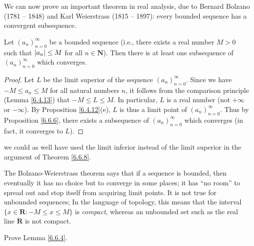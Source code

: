 \begin{note}
    We can now prove an important theorem in real analysis, due to Bernard Bolzano (1781 -- 1848) and Karl Weierstrass (1815 -- 1897):
    every bounded sequence has a convergent subsequence.
\end{note}

\begin{theorem}\label{6.6.8}
    Let \((a_n)_{n = 0}^\infty\) be a bounded sequence
    (i.e., there exists a real number \(M > 0\) such that \(\abs*{a_n} \leq M\) for all \(n \in \mathbf{N}\)).
    Then there is at least one subsequence of \((a_n)_{n = 0}^\infty\) which converges.
\end{theorem}

\begin{proof}
    Let \(L\) be the limit superior of the sequence \((a_n)_{n = 0}^\infty\).
    Since we have \(-M \leq a_n \leq M\) for all natural numbers \(n\), it follows from the comparison principle (Lemma \ref{6.4.13}) that \(-M \leq L \leq M\).
    In particular, \(L\) is a real number (not \(+\infty\) or \(-\infty\)).
    By Proposition \ref{6.4.12}(e), \(L\) is thus a limit point of \((a_n)_{n = 0}^\infty\).
    Thus by Proposition \ref{6.6.6}, there exists a subsequence of \((a_n)_{n = 0}^\infty\) which converges
    (in fact, it converges to \(L\)).
\end{proof}

\begin{note}
    we could as well have used the limit inferior instead of the limit superior in the argument of Theorem \ref{6.6.8}.
\end{note}

\begin{remark}\label{6.6.9}
    The Bolzano-Weierstrass theorem says that if a sequence is bounded, then eventually it has no choice but to converge in some places;
    it has ``no room'' to spread out and stop itself from acquiring limit points.
    It is not true for unbounded sequences;
    In the language of topology, this means that the interval \(\{x \in \mathbf{R} : -M \leq x \leq M\}\) is \emph{compact}, whereas an unbounded set such as the real line \(\mathbf{R}\) is not compact.
\end{remark}

\exercisesection

\begin{exercise}\label{ex 6.6.1}
    Prove Lemma \ref{6.6.4}.
\end{exercise}

